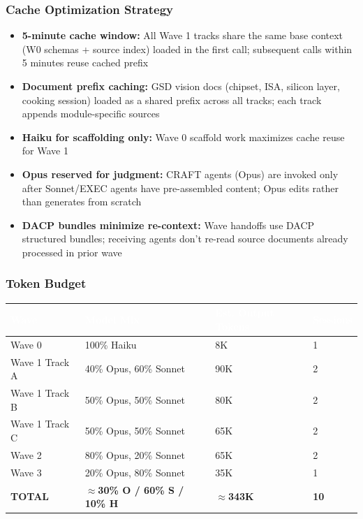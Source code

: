 \documentclass[11pt,letterpaper]{article}
\newcommand{\tableheader}[1]{\textbf{\sffamily\textcolor{white}{#1}}}
\begin{document}
\subsubsection{Cache Optimization Strategy}

\begin{itemize}[leftmargin=1.5em]
  \item \textbf{5-minute cache window:} All Wave 1 tracks share the same base context (W0 schemas + source index) loaded in the first call; subsequent calls within 5 minutes reuse cached prefix
  \item \textbf{Document prefix caching:} GSD vision docs (chipset, ISA, silicon layer, cooking session) loaded as a shared prefix across all tracks; each track appends module-specific sources
  \item \textbf{Haiku for scaffolding only:} Wave 0 scaffold work maximizes cache reuse for Wave 1
  \item \textbf{Opus reserved for judgment:} CRAFT agents (Opus) are invoked only after Sonnet/EXEC agents have pre-assembled content; Opus edits rather than generates from scratch
  \item \textbf{DACP bundles minimize re-context:} Wave handoffs use DACP structured bundles; receiving agents don't re-read source documents already processed in prior wave
\end{itemize}

\subsubsection{Token Budget}

\begin{center}
\begin{tabularx}{\textwidth}{L{3cm}L{2.5cm}L{3cm}L{2.5cm}}
\toprule
{}
\tableheader{Wave} & \tableheader{Model Mix} & \tableheader{Est. Output Tokens} & \tableheader{Sessions} \\
\midrule
Wave 0 & 100\% Haiku & 8K & 1 \\
Wave 1 Track A & 40\% Opus, 60\% Sonnet & 90K & 2 \\
Wave 1 Track B & 50\% Opus, 50\% Sonnet & 80K & 2 \\
Wave 1 Track C & 50\% Opus, 50\% Sonnet & 65K & 2 \\
Wave 2 & 80\% Opus, 20\% Sonnet & 65K & 2 \\
Wave 3 & 20\% Opus, 80\% Sonnet & 35K & 1 \\
\textbf{TOTAL} & \textbf{$\approx$30\% O / 60\% S / 10\% H} & \textbf{$\approx$343K} & \textbf{10} \\
\bottomrule
\end{tabularx}
\end{center}
\end{document}
